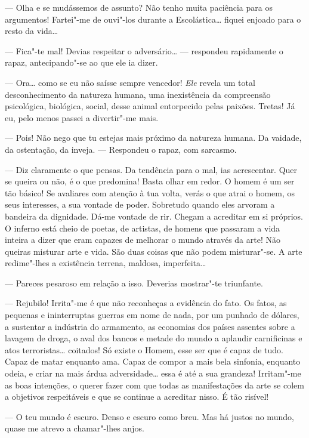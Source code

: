 --- Olha e se mudássemos de assunto? Não tenho muita paciência para os
argumentos! Fartei"-me de ouvi"-los durante a Escolástica\ldots{} fiquei
enjoado para o resto da vida\ldots{}

--- Fica"-te mal! Devias respeitar o adversário\ldots{} --- respondeu rapidamente
o rapaz, antecipando"-se ao que ele ia dizer.

--- Ora\ldots{} como se eu não saísse sempre vencedor! \emph{Ele} revela um
total desconhecimento da natureza humana, uma inexistência da
compreensão psicológica, biológica, social, desse animal entorpecido
pelas paixões. Tretas! Já eu, pelo menos passei a divertir"-me mais.

--- Pois! Não nego que tu estejas mais próximo da natureza humana. Da
vaidade, da ostentação, da inveja. --- Respondeu o rapaz, com sarcasmo.

--- Diz claramente o que pensas. Da tendência para o mal, ias acrescentar.
Quer se queira ou não, é o que predomina! Basta olhar em redor. O homem
é um ser tão básico! Se avaliares com atenção à tua volta, verás o que
atrai o homem, os seus interesses, a sua vontade de poder. Sobretudo
quando eles arvoram a bandeira da dignidade. Dá-me vontade de rir.
Chegam a acreditar em si próprios. O inferno está cheio de poetas, de
artistas, de homens que passaram a vida inteira a dizer que eram capazes
de melhorar o mundo através da arte! Não queiras misturar arte e vida.
São duas coisas que não podem misturar"-se. A arte redime"-lhes a
existência terrena, maldosa, imperfeita\ldots{}

--- Pareces pesaroso em relação a isso. Deverias mostrar"-te triunfante.

--- Rejubilo! Irrita"-me é que não reconheças a evidência do fato. Os
fatos, as pequenas e ininterruptas guerras em nome de nada, por um
punhado de dólares, a sustentar a indústria do armamento, as economias
dos países assentes sobre a lavagem de droga, o aval dos bancos e metade
do mundo a aplaudir carnificinas e atos terroristas\ldots{} coitados! Só
existe o Homem, esse ser que é capaz de tudo. Capaz de matar enquanto
ama. Capaz de compor a mais bela sinfonia, enquanto odeia, e criar na
mais árdua adversidade\ldots{} essa é até a sua grandeza! Irritam"-me as boas
intenções, o querer fazer com que todas as manifestações da arte se
colem a objetivos respeitáveis e que se continue a acreditar nisso. É
tão risível!

--- O teu mundo é escuro. Denso e escuro como breu. Mas há justos no
mundo, quase me atrevo a chamar"-lhes anjos.

